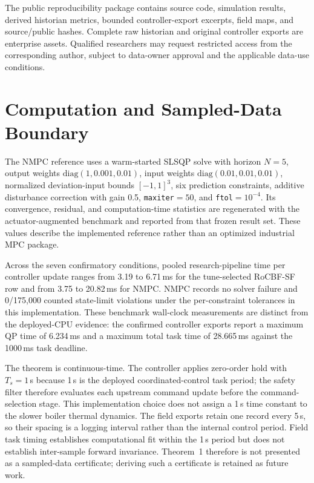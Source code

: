 The public reproducibility package contains source code, simulation results, derived historian metrics, bounded controller-export excerpts, field maps, and source/public hashes. Complete raw historian and original controller exports are enterprise assets. Qualified researchers may request restricted access from the corresponding author, subject to data-owner approval and the applicable data-use conditions.

\section{Computation and Sampled-Data Boundary}
\label{sec:supp_computation}

The NMPC reference uses a warm-started SLSQP solve with horizon $N=5$, output weights $\mathrm{diag}(1,0.001,0.01)$, input weights $\mathrm{diag}(0.01,0.01,0.01)$, normalized deviation-input bounds $[-1,1]^3$, six prediction constraints, additive disturbance correction with gain 0.5, \texttt{maxiter}$=50$, and \texttt{ftol}$=10^{-4}$. Its convergence, residual, and computation-time statistics are regenerated with the actuator-augmented benchmark and reported from that frozen result set. These values describe the implemented reference rather than an optimized industrial MPC package.

Across the seven confirmatory conditions, pooled research-pipeline time per controller update ranges from 3.19 to 6.71\,ms for the tune-selected RoCBF-SF row and from 3.75 to 20.82\,ms for NMPC. NMPC records no solver failure and 0/175{,}000 counted state-limit violations under the per-constraint tolerances in this implementation. These benchmark wall-clock measurements are distinct from the deployed-CPU evidence: the confirmed controller exports report a maximum QP time of 6.234\,ms and a maximum total task time of 28.665\,ms against the 1000\,ms task deadline.

The theorem is continuous-time. The controller applies zero-order hold with $T_s=1$\,s because 1\,s is the deployed coordinated-control task period; the safety filter therefore evaluates each upstream command update before the command-selection stage. This implementation choice does not assign a 1\,s time constant to the slower boiler thermal dynamics. The field exports retain one record every 5\,s, so their spacing is a logging interval rather than the internal control period. Field task timing establishes computational fit within the 1\,s period but does not establish inter-sample forward invariance. Theorem~1 therefore is not presented as a sampled-data certificate; deriving such a certificate is retained as future work.
